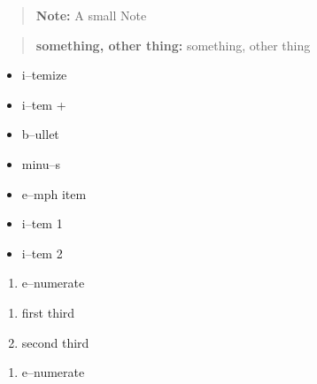 \documentclass{book}
\begin{document}
\begin{titlepage}
\begin{quote}
\begin{footnotesize}
\textbf{Note:} A small Note
\end{footnotesize}
\end{quote}

\begin{quote}
\begin{footnotesize}
\textbf{something, other thing:} something, other thing
\end{footnotesize}
\end{quote}

\begin{itemize}
\item i--temize
\end{itemize}

\begin{itemize}[label=+]
\item i--tem +
\end{itemize}

\begin{itemize}[label=\textbullet{}]
\item b--ullet
\end{itemize}

\begin{itemize}[label=-]
\item minu--s
\end{itemize}

\begin{itemize}[label=\emph{after emph}]
\item e--mph item
\end{itemize}

\begin{itemize}[label=\textbullet{} a--n itemize line]
\item {}%
i--tem 1
\item i--tem 2
\end{itemize}

\begin{enumerate}[start=1]
\item e--numerate
\end{enumerate}

\begin{enumerate}[start=3]
\item first third
\item second third
\end{enumerate}

\begin{enumerate}[label=\alph*.]
\item e--numerate
\end{enumerate}


\end{titlepage}
\end{document}
